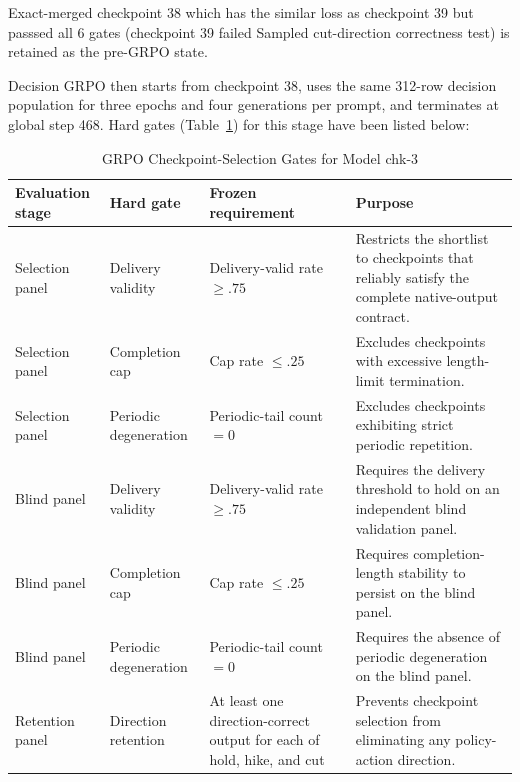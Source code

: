 Exact-merged checkpoint 38 which has the similar loss as checkpoint 39 but passsed all 6 gates (checkpoint 39 failed Sampled cut-direction correctness test) is retained as the pre-GRPO state. 


Decision GRPO then starts from checkpoint 38, uses the same 312-row decision population for three epochs and four generations per prompt, and terminates at global step 468. Hard gates (Table~\ref{tab:app:chk3_grpo_hard_gates}) for this stage have been listed below:


\begin{table}[htbp]
\centering
\caption{GRPO Checkpoint-Selection Gates for Model chk-3}
\label{tab:app:chk3_grpo_hard_gates}
\footnotesize
\setlength{\tabcolsep}{5pt}
\renewcommand{\arraystretch}{1.15}
\begin{tabularx}{\textwidth}{
    @{}
    p{}
    p{}
    p{}
    X
    @{}
}
\toprule
Evaluation stage & Hard gate & Frozen requirement & Purpose \\
\midrule

Selection panel
& Delivery validity
& Delivery-valid rate $\geq .75$
& Restricts the shortlist to checkpoints that reliably satisfy the complete native-output contract. \\

Selection panel
& Completion cap
& Cap rate $\leq .25$
& Excludes checkpoints with excessive length-limit termination. \\

Selection panel
& Periodic degeneration
& Periodic-tail count $=0$
& Excludes checkpoints exhibiting strict periodic repetition. \\

\midrule

Blind panel
& Delivery validity
& Delivery-valid rate $\geq .75$
& Requires the delivery threshold to hold on an independent blind validation panel. \\

Blind panel
& Completion cap
& Cap rate $\leq .25$
& Requires completion-length stability to persist on the blind panel. \\

Blind panel
& Periodic degeneration
& Periodic-tail count $=0$
& Requires the absence of periodic degeneration on the blind panel. \\

\midrule

Retention panel
& Direction retention
& At least one direction-correct output for each of hold, hike, and cut
& Prevents checkpoint selection from eliminating any policy-action direction. \\

\bottomrule
\end{tabularx}
\end{table}

